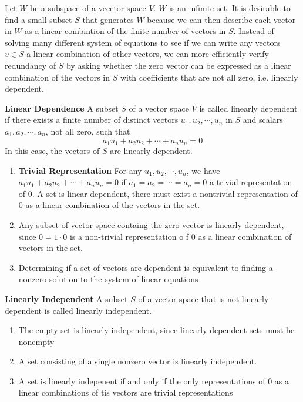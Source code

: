 \documentclass[11pt]{article}
\begin{document}


\begin{rem}
    Let $W$ be a subspace of a vecetor space $V$. $W$ is an infinite set. It is desirable to find a small subset $S$ that generates $W$ because we can then describe each vector in $W$ as a linear combintion of the finite number of vectors in $S$. Instead of solving many different system of equations to see if we can write any vectors $v\in S$ a linear combination of other vectors, we can more efficiently verify redundancy of $S$ by asking whether the zero vector can be expressed as a linear combination of the vectors in $S$ with coefficients that are not all zero, i.e. linearly dependent. 
\end{rem}

\begin{defn*}
    \textbf{Linear Dependence} A subset $S$ of a vector space $V$ is called linearly dependent if there exists a finite number of distinct vectors $u_1, u_2, \cdots, u_n$ in $S$ and scalars $a_1, a_2, \cdots, a_n$, not all zero, such that 
    \[
        a_1 u_1 + a_2 u_2 + \cdots + a_n u_n = 0     
    \]
    In this case, the vectors of $S$ are linearly dependent. 
    \begin{enumerate}
        \item \textbf{Trivial Representation} For any $u_1, u_2 ,\cdots, u_n$, we have $a_1 u_1 + a_2 u_2 + \cdots + a_n u_n = 0$ if $a_1 = a_2 = \cdots = a_n = 0$ a trivial representation of 0. A set is linear dependent, there must exist a nontrivial representation of 0 as a linear combination of the vectors in the set.
        \item Any subset of vector space containg the zero vector is linearly dependent, since $0 = 1\cdot 0$ is a non-trivial representation o f 0 as a linear combination of vectors in the set. 
        \item Determining if a set of vectors are dependent is equivalent to finding a nonzero solution to the system of linear equations
    \end{enumerate}
\end{defn*}


\begin{defn*}
    \textbf{Linearly Independent} A subset $S$ of a vector space that is not linearly dependent is called linearly independent. 
    \begin{enumerate}
        \item The empty set is linearly independent, since linearly dependent sets must be nonempty
        \item A set consisting of a single nonzero vector is linearly independent. 
        \item A set is linearly indepenent if and only if the only representations of 0 as a linear combinations of tis vectors are trivial representations
    \end{enumerate}
\end{defn*}
\end{document}
